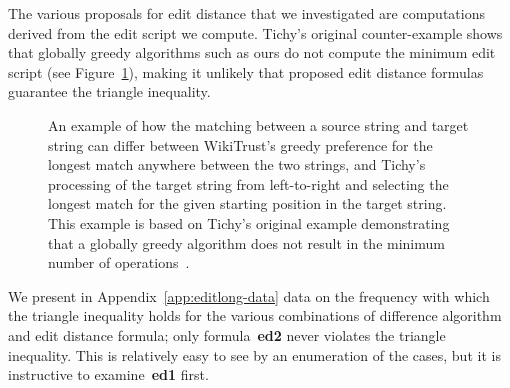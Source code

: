 The various proposals for edit distance that we investigated are
computations derived from the edit script we compute.
Tichy's original counter-example shows that globally greedy algorithms
such as ours do not compute the minimum edit script
(see Figure~\ref{fig:match-comparison}), making it unlikely that
proposed edit distance formulas guarantee the triangle inequality.

\begin{figure}[htbp]
\centering
  \hspace{2ex}
\caption[An example of when WikiTrust and Tichy differ in matching.]{
  An example of how the matching between a source string and target string
  can differ between WikiTrust's greedy preference for the longest match
  anywhere between the two strings, and Tichy's processing of the
  target string from left-to-right and selecting the longest match
  for the given starting position in the target string.
  This example is based on Tichy's original example demonstrating that
  a globally greedy algorithm does not result in the minimum number of
  operations~\cite{Tichy1984}.
}
\label{fig:match-comparison}
\end{figure}

We present in Appendix~\ref{app:editlong-data} data on the frequency
with which the triangle inequality holds for the various combinations
of difference algorithm and edit distance formula; only formula~\textbf{ed2}
never violates the triangle inequality.
This is relatively easy to see by an enumeration of the cases, but it
is instructive to examine~\textbf{ed1} first.

